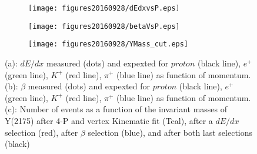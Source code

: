\documentclass[a4paper]{article}
\begin{document}
\begin{figure}[htbp]
  \centering
  \begin{subfigure}[b]{0.3\textwidth}
    \texttt{[image: figures20160928/dEdxvsP.eps]}
    \caption{}
  \end{subfigure}
  \begin{subfigure}[b]{0.3\textwidth}
    \texttt{[image: figures20160928/betaVsP.eps]}
    \caption{}
  \end{subfigure}
  \begin{subfigure}[b]{0.3\textwidth}
    \texttt{[image: figures20160928/YMass\_cut.eps]}
    \caption{}
  \end{subfigure}
  \caption{(a): $dE/dx$ measured (dots) and expexted for $proton$ (black line), $e^{+}$ (green line), $K^{+}$ (red line), $\pi^{+}$ (blue line) as function of momentum. (b): $\beta$ measured (dots) and expexted for $proton$ (black line), $e^{+}$ (green line), $K^{+}$ (red line), $\pi^{+}$ (blue line) as function of momentum. (c): Number of events as a function of the invariant masses of Y(2175) after 4-P and vertex Kinematic fit (Teal), after a $dE/dx$ selection (red), after $\beta$ selection (blue), and after both last selections (black)}
  \label{fig:1.4}
\end{figure}

\printbibliography
\end{document}
